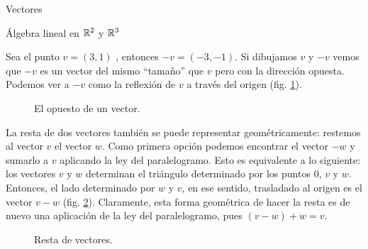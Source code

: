 \begin{chapter}{Vectores}
\begin{section}{\'Algebra lineal en $\mathbb R^2$ y $\mathbb R^3$}
    
    \begin{ejemplo*} Sea el punto $v =(3, 1)$ , entonces $-v = (- 3, - 1)$. Si dibujamos $v$ y $-v$ vemos que $-v$ es un vector del mismo ``tamaño'' que $v$ pero con la dirección opuesta. Podemos ver a $-v$ como la reflexión de $v$ a través del origen (fig. \ref{fig-vector-opuesto}). 
    \begin{figure}[h]
    	\centering
        \caption{El opuesto de un vector.}\label{fig-vector-opuesto}
    \end{figure}
    \end{ejemplo*}




    La resta de dos vectores también se puede representar geométricamente: restemos  al vector $v$ el vector $w$. Como primera opción podemos encontrar el  vector $-w$ y sumarlo  a $v$ aplicando la ley del paralelogramo. Esto es equivalente a lo siguiente: los vectores $v$ y $w$ determinan el triángulo determinado por los puntos $0$, $v$ y $w$. Entonces,  el lado determinado por $w$ y $v$,  en ese sentido, trasladado al origen es el vector $v-w$  (fig. \ref{fig-resta-de-vectores}). Claramente, esta forma geométrica de hacer la resta  es de nuevo una aplicación de la ley del paralelogramo, pues $(v-w)+ w= v$.
    \begin{figure}[h]
    	\centering
        \caption{Resta de vectores.}\label{fig-resta-de-vectores}
    \end{figure}
    

\end{section}
\end{chapter}
